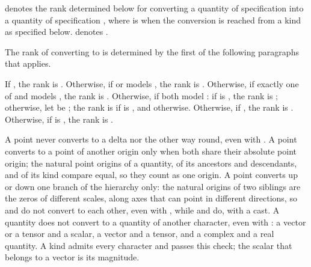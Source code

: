 \pnum
{} denotes
the rank determined below for converting
a quantity of specification  into a quantity of specification ,
where  is  when the conversion is reached from a kind
as specified below.
 denotes
.

\pnum
The rank of converting  to  is determined by
the first of the following paragraphs that applies.

\pnum
If , the rank is .
Otherwise, if  or  models ,
the rank is
.
Otherwise, if exactly one of  and 
models , the rank is .
Otherwise, if both model :
if 
is , the rank is ;
otherwise, let  be
;
the rank is  if  is , and  otherwise.
Otherwise, if , the rank is .
Otherwise, if  is ,
the rank is .
\begin{note}
A point never converts to a delta nor the other way round, even with .
A point converts to a point of another origin only when both share their absolute point origin;
the natural point origins of a quantity, of its ancestors and descendants, and of its kind compare equal,
so they count as one origin.
A point converts up or down one branch of the hierarchy only:
the natural origins of two siblings are the zeros of different scales,
along axes that can point in different directions,
so  and  do not convert to each other,
even with , while  and  do, with a cast.
A quantity does not convert to a quantity of another character, even with :
a vector or a tensor and a scalar, a vector and a tensor, and a complex and a real quantity.
A kind admits every character and passes this check;
the scalar that belongs to a vector is its magnitude.
\end{note}
